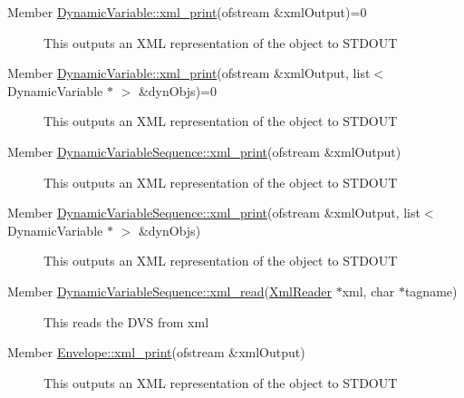 \label{_deprecated000008}
\hypertarget{deprecated__deprecated000008}{}
 \begin{description}
\item[Member \hyperlink{classDynamicVariable_a12}{Dynamic\-Variable::xml\_\-print}(ofstream \&xml\-Output)=0 ]This outputs an XML representation of the object to STDOUT \end{description}


\label{_deprecated000007}
\hypertarget{deprecated__deprecated000007}{}
 \begin{description}
\item[Member \hyperlink{classDynamicVariable_a11}{Dynamic\-Variable::xml\_\-print}(ofstream \&xml\-Output, list$<$ Dynamic\-Variable $\ast$ $>$ \&dyn\-Objs)=0 ]This outputs an XML representation of the object to STDOUT \end{description}


\label{_deprecated000011}
\hypertarget{deprecated__deprecated000011}{}
 \begin{description}
\item[Member \hyperlink{classDynamicVariableSequence_a28}{Dynamic\-Variable\-Sequence::xml\_\-print}(ofstream \&xml\-Output) ]This outputs an XML representation of the object to STDOUT \end{description}


\label{_deprecated000010}
\hypertarget{deprecated__deprecated000010}{}
 \begin{description}
\item[Member \hyperlink{classDynamicVariableSequence_a27}{Dynamic\-Variable\-Sequence::xml\_\-print}(ofstream \&xml\-Output, list$<$ Dynamic\-Variable $\ast$ $>$ \&dyn\-Objs) ]This outputs an XML representation of the object to STDOUT \end{description}


\label{_deprecated000012}
\hypertarget{deprecated__deprecated000012}{}
 \begin{description}
\item[Member \hyperlink{classDynamicVariableSequence_a29}{Dynamic\-Variable\-Sequence::xml\_\-read}(\hyperlink{classXmlReader}{Xml\-Reader} $\ast$xml, char $\ast$tagname) ]This reads the DVS from xml \end{description}


\label{_deprecated000014}
\hypertarget{deprecated__deprecated000014}{}
 \begin{description}
\item[Member \hyperlink{classEnvelope_a30}{Envelope::xml\_\-print}(ofstream \&xml\-Output) ]This outputs an XML representation of the object to STDOUT \end{description}


